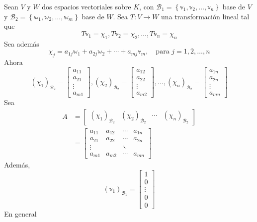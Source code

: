 \newpage
Sean $V$ y $W$ dos espacios vectoriales sobre $K$, con $\mathcal{B}_1 = \left\{ \mathbb{v}_1, \mathbb{v}_2, \dots, \mathbb{v}_n \right\}$ base de $V$ y $\mathcal{B}_2 = \left\{ \mathbb{w}_1, \mathbb{w}_2, \dots, \mathbb{w}_m \right\}$ base de $W$. Sea $T: V \longrightarrow W$ una transformación lineal tal que
$$T\mathbb{v}_1 = \chi_1, T\mathbb{v}_2 = \chi_2, \dots, T\mathbb{v}_n = \chi_n$$
Sea además
$$\chi_j = a_{1j}\mathbb{w}_1 + a_{2j}\mathbb{w}_2 + \cdots + a_{mj}\mathbb{v}_m, \quad \text{para } j = 1, 2, \dots, n$$
Ahora
$$(\chi_1)_{\mathcal{B}_2} = \begin{bmatrix} a_{11} \\ a_{21} \\ \vdots \\ a_{m1} \end{bmatrix}, (\chi_2)_{\mathcal{B}_2} = \begin{bmatrix} a_{12} \\ a_{22} \\ \vdots \\ a_{m2} \end{bmatrix}, \dots, (\chi_n)_{\mathcal{B}_2} = \begin{bmatrix} a_{1n} \\ a_{2n} \\ \vdots \\ a_{mn} \end{bmatrix}$$
Sea
\begin{align*}
    A & = \begin{bmatrix}
        (\chi_1)_{\mathcal{B}_2} & (\chi_2)_{\mathcal{B}_2} & \cdots & (\chi_n)_{\mathcal{B}_2}
    \end{bmatrix} \\
    & = \begin{bmatrix}
        a_{11} & a_{12} & \cdots & a_{1n} \\
        a_{21} & a_{22} & \cdots & a_{2n} \\
        \vdots & & \ddots & \\
        a_{m1} & a_{m2} & \cdots & a_{mn}
    \end{bmatrix}
\end{align*}
Además,
$$(\mathbb{v}_1)_{\mathcal{B}_1} = \begin{bmatrix}
    1 \\
    0 \\
    \vdots \\
    0 \\
    0
\end{bmatrix}$$
En general
